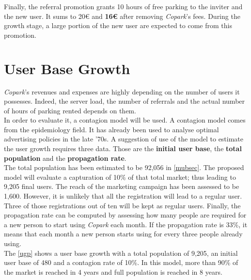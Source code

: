 \documentclass[12pt,a4paper,oneside]{book}
\newcommand{\bp}{\textit{Copark}}
\begin{document}
Finally, the referral promotion grants 10 hours of free parking to the inviter and the new user. It sums to 20\euro{} and \textbf{16\euro{}} after removing \bp{}'s fees. During the growth stage, a large portion of the new user are expected to come from this promotion.

\section{User Base Growth}
\bp{}'s revenues and expenses are highly depending on the number of users it possesses. Indeed, the server load, the number of referrals and the actual number of hours of parking rented depends on them.\\

In order to evaluate it, a contagion model will be used. A contagion model comes from the epidemiology field. It has already been used to analyse optimal advertising policies in the late ’70s.\cite{sethi1979optimal} A suggestion of use of the model to estimate the user growth requires three data. Those are the \textbf{initial user base}, the \textbf{total population} and the \textbf{propagation rate}.\cite{cmep}\\

The total population has been estimated to be 92,056 in \autoref{mubsec}. The proposed model will evaluate a capturation of 10\% of that total market; thus leading to 9,205 final users. The reach of the marketing campaign has been assessed to be 1,600. However, it is unlikely that all the registration will lead to a regular user. Three of those registrations out of ten will be kept as regular users. Finally, the propagation rate can be computed by assessing how many people are required for a new person to start using \bp{} each month. If the propagation rate is 33\%, it means that each month a new person starts using for every three people already using.\\

The \autoref{ugp} shows a user base growth with a total population of 9,205, an initial user base of 480 and a contagion rate of 10\%. In this model, more than 90\% of the market is reached in 4 years and full population is reached in 8 years.\\
\end{document}
